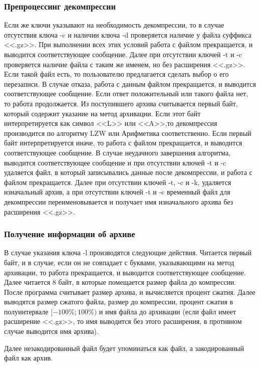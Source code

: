 \documentclass[12pt]{article}
\begin{document}
\subsubsection*{Препроцессинг декомпрессии}

Если же ключи указывают на необходимость декомпрессии, то в случае отсутствия ключа -c и наличии ключа -d проверяется наличие у файла суффикса <<.gz>>. При выполнении всех этих условий работа с файлом прекращается, и выводится соответствующее сообщение. Далее при отсутствии ключей -t и -c проверяется наличие файла с таким же именем, но без расширения <<.gz>>. Если такой файл есть, то пользователю предлагается сделать выбор о его перезаписи. В случае отказа, работа с данным файлом прекращается, и выводится соответствующее сообщение. Если ответ положительный или такого файла нет, то работа продолжается. Из поступившего архива считывается первый байт, который содержит указание на метод архивации. Если этот байт интерпретируется как символ <<L>> или <<A>>,то декомпрессия производится по алгоритму LZW или Арифметика соответственно. Если первый байт интерпретируется иначе, то работа с файлом прекращается, и выводится соответствующее сообщение. В случае неудачного завершения алгоритма, выводится соответствующее сообщение и при отсутствии ключей -t и -c удаляется файл, в который записывались данные после декомпрессии, и работа с файлом прекращается. Далее при отсутствии ключей -t, -c и -k, удаляется изначальный архив, а при отсутствии ключей -t и -c временный файл для декомпрессии переименовывается и получает имя изначального архива без расширения <<.gz>>.

\subsubsection*{Получение информации об архиве}

В случае указания ключа -l производятся следующие действия. Читается первый байт, и в случае, если он не совпадает с буквами, указывающими на метод архивации, то работа прекращается, и выводится соответствующее сообщение. Далее читается 8 байт, в которые помещается размер файла до компрессии. После программа считывает размер архива, и вычисляется процент сжатия. Далее выводятся размер сжатого файла, размер до компрессии, процент сжатия в полуинтервале $[-100\%; 100\%)$ и имя файла до архивации (если файл имеет расширение <<.gz>>, то имя выводится без этого расширения, в противном случае выводится имя архива).

Далее незакодированный файл будет упоминаться как файл, а закодированный файл как архив.%
\end{document}

